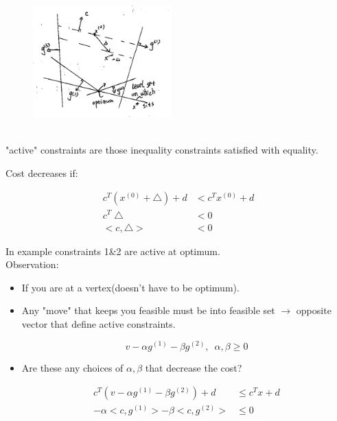 \begin{figure}
	\centering
	\includegraphics[width=2.1in,height=2.1in]{figures/ch07/figure1012_8.png}
\end{figure}





"active" constraints are those inequality constraints satisfied with equality. 

Cost decreases if:

\begin{align*}
c^T(x^{(0)} + \bigtriangleup) + d &< c^Tx^{(0)} + d\\
c^T\bigtriangleup &< 0\\
<c, \bigtriangleup> &< 0
\end{align*}


In example constraints 1\&2 are active at optimum.\\

Observation: 

\begin{itemize}
	\item If you are at a vertex(doesn't have to be optimum). 
	
	\item Any "move" that keeps you feasible must be into feasible set $\rightarrow$ opposite vector that define active constraints.
	
	\begin{equation*}
	v - \alpha g^{(1)} - \beta g^{(2)}, \,\,\, \alpha, \beta \geq 0
	\end{equation*}
	
	\item Are these any choices of $\alpha, \beta$ that decrease the cost?
	
	\begin{align*}
	c^T(v - \alpha g^{(1)} - \beta g^{(2)}) + d &\leq c^Tx + d\\
	-\alpha <c, g^{(1)}> - \beta<c, g^{(2)}> &\leq 0
	\end{align*}
\end{itemize}

